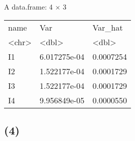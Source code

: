 \documentclass[11pt]{article}
\begin{document}
    A data.frame: 4 × 3
\begin{tabular}{lll}
 name & Var & Var\_hat\\
 <chr> & <dbl> & <dbl>\\
\hline
	 I1 & 6.017275e-04 & 0.0007254\\
	 I2 & 1.522177e-04 & 0.0001729\\
	 I3 & 1.522177e-04 & 0.0001729\\
	 I4 & 9.956849e-05 & 0.0000550\\
\end{tabular}


    
    \hypertarget{section}{%
\subsection{(4)}\label{section}}
\end{document}
